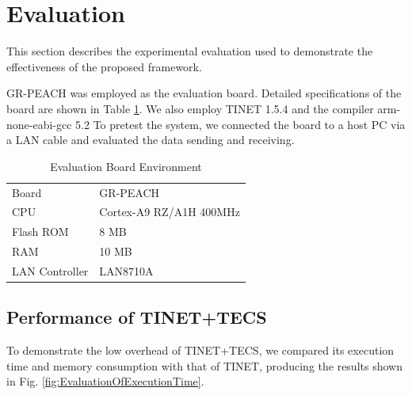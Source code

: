 \documentclass[JIP]{ipsj_v2/UTF8/ipsj}
\begin{document}
\section{Evaluation}
\label{sec:Evaluation}

This section describes the experimental evaluation used to demonstrate the effectiveness of the proposed framework.


GR-PEACH was employed as the evaluation board.
Detailed specifications of the board are shown in Table \ref{tab:EvaluationBoardEnvironment}.
We also employ TINET 1.5.4 and the compiler arm-none-eabi-gcc 5.2
To pretest the system, we connected the board to a host PC via a LAN cable and evaluated the data sending and receiving.

\begin{table}[t]
    \centering
    \caption{Evaluation Board Environment}
    \begin{tabular}{l|l}
        \hline\hline
        Board           &   GR-PEACH                \\
        CPU             &   Cortex-A9 RZ/A1H 400MHz \\
        Flash ROM       &   8 MB                    \\
        RAM             &   10 MB                   \\
        LAN Controller  &   LAN8710A                \\
        \hline
    \end{tabular}
    \label{tab:EvaluationBoardEnvironment}
\end{table}

\subsection{Performance of TINET+TECS}

To demonstrate the low overhead of TINET+TECS, we compared its execution time and memory consumption with that of TINET, producing the results shown in Fig. \ref{fig:EvaluationOfExecutionTime}.
\end{document}
